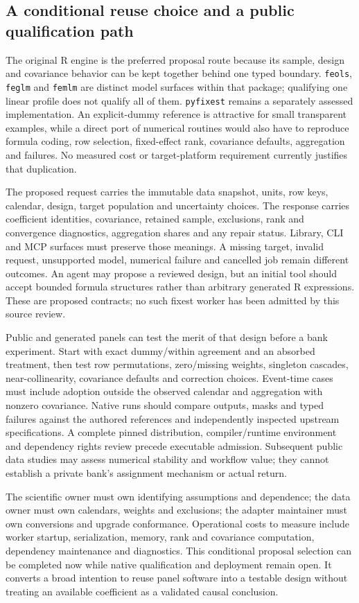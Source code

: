 \subsection{A conditional reuse choice and a public qualification path}
\label{exec20:fx-choice}
The original R engine is the preferred proposal route because its sample,
design and covariance behavior can be kept together behind one typed boundary.
\texttt{feols}, \texttt{feglm} and \texttt{femlm} are distinct model surfaces
within that package; qualifying one linear profile does not qualify all of
them. \texttt{pyfixest} remains a separately assessed implementation.
An explicit-dummy reference is attractive for small transparent examples,
while a direct port of numerical routines would also have to reproduce
formula coding, row selection, fixed-effect rank, covariance defaults,
aggregation and failures. No measured cost or target-platform requirement
currently justifies that duplication.\citep{exec20_fixest_source,exec20_fixest_reference}

The proposed request carries the immutable data snapshot, units, row keys,
calendar, design, target population and uncertainty choices. The response
carries coefficient identities, covariance, retained sample, exclusions,
rank and convergence diagnostics, aggregation shares and any repair status.
Library, CLI and MCP surfaces must preserve those meanings. A missing target,
invalid request, unsupported model, numerical failure and cancelled job
remain different outcomes. An agent may propose a reviewed design, but an
initial tool should accept bounded formula structures rather than arbitrary
generated R expressions. These are proposed contracts; no such fixest worker
has been admitted by this source review.

Public and generated panels can test the merit of that design before a bank
experiment. Start with exact dummy/within agreement and an absorbed treatment,
then test row permutations, zero/missing weights, singleton cascades,
near-collinearity, covariance defaults and correction choices. Event-time
cases must include adoption outside the observed calendar and aggregation
with nonzero covariance. Native runs should compare outputs, masks and typed
failures against the authored references and independently inspected upstream
specifications. A complete pinned distribution, compiler/runtime environment
and dependency rights review precede executable admission. Subsequent public
data studies may assess numerical stability and workflow value; they cannot
establish a private bank's assignment mechanism or actual return.

The scientific owner must own identifying assumptions and dependence; the
data owner must own calendars, weights and exclusions; the adapter maintainer
must own conversions and upgrade conformance. Operational costs to measure
include worker startup, serialization, memory, rank and covariance computation,
dependency maintenance and diagnostics. This conditional proposal selection
can be completed now while native qualification and deployment remain open.
It converts a broad intention to reuse panel software into a testable design
without treating an available coefficient as a validated causal conclusion.
